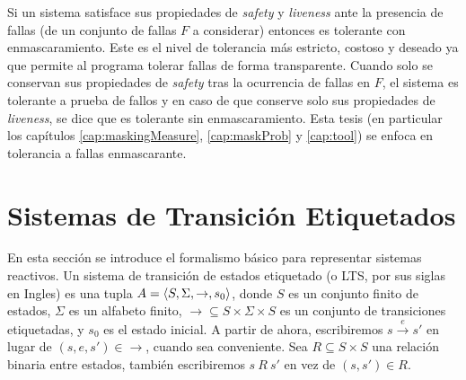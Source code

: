 Si un sistema satisface sus propiedades de \textit{safety} y \textit{liveness} ante la presencia de fallas (de un conjunto de fallas $F$ a considerar) entonces es tolerante con enmascaramiento. Este es el nivel de tolerancia más estricto, costoso y deseado ya que permite al programa tolerar fallas de forma transparente.
Cuando solo se conservan sus propiedades de \textit{safety} tras la ocurrencia de fallas en $F$, el sistema es tolerante a prueba de fallos y en caso de que conserve solo sus propiedades de \textit{liveness}, se dice que es tolerante sin enmascaramiento.
Esta tesis (en particular los capítulos \ref{cap:maskingMeasure}, \ref{cap:maskProb} y \ref{cap:tool}) se enfoca en tolerancia a fallas enmascarante.

\section{Sistemas de Transición Etiquetados}

En esta sección se introduce el formalismo básico para representar sistemas reactivos.
Un sistema de transición de estados etiquetado (o LTS, por sus siglas en Ingles) es una tupla $A =\langle S, \Sigma, \rightarrow, s_0 \rangle$, donde $S$ es un conjunto finito de estados, $\Sigma$ es un alfabeto finito,  $\rightarrow \subseteq S \times \Sigma \times S$ es un conjunto de transiciones etiquetadas, y $s_0$ es el estado inicial. A partir de ahora, escribiremos $s \xrightarrow{e} s'$ en lugar de $(s,e,s') \in \rightarrow$, cuando sea conveniente. Sea $R \subseteq S \times S$ una relación binaria entre estados, también escribiremos $s\ R\ s'$ en vez de $(s,s') \in R$.

